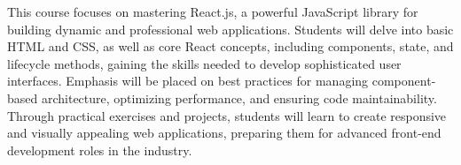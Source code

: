 This course focuses on mastering React.js, a powerful JavaScript library for building dynamic and professional web applications.
Students will delve into basic HTML and CSS, as well as core React concepts, including components, state, and lifecycle methods, gaining the skills needed to develop sophisticated user interfaces.
Emphasis will be placed on best practices for managing component-based architecture, optimizing performance, and ensuring code maintainability.
Through practical exercises and projects, students will learn to create responsive and visually appealing web applications, preparing them for advanced front-end development roles in the industry.
